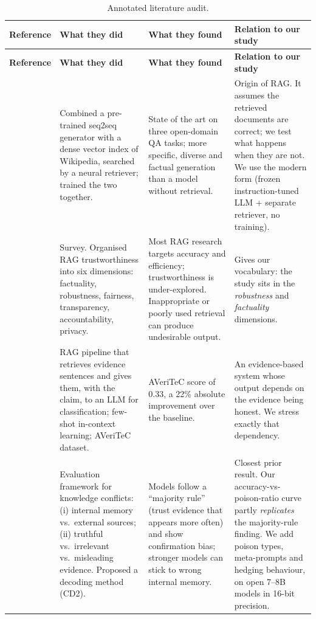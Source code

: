 \documentclass[11pt,a4paper]{report}
\begin{document}
{\small
\renewcommand{\arraystretch}{1.25}
\begin{longtable}{
  >{\raggedright\arraybackslash}p{2.2cm}
  >{\raggedright\arraybackslash}p{3.9cm}
  >{\raggedright\arraybackslash}p{3.9cm}
  >{\raggedright\arraybackslash}p{4.2cm}}
\caption{Annotated literature audit.}\label{tab:audit}\\
\toprule
\textbf{Reference} & \textbf{What they did} & \textbf{What they found} & \textbf{Relation to our study} \\
\midrule
\endfirsthead
\toprule
\textbf{Reference} & \textbf{What they did} & \textbf{What they found} & \textbf{Relation to our study} \\
\midrule
\endhead
\bottomrule
\endfoot

\citet{lewis2020rag}
& Combined a pre-trained seq2seq generator with a dense vector index of
  Wikipedia, searched by a neural retriever; trained the two together.
& State of the art on three open-domain QA tasks; more specific, diverse
  and factual generation than a model without retrieval.
& Origin of RAG. It assumes the retrieved documents are correct; we test
  what happens when they are not. We use the modern form (frozen
  instruction-tuned LLM + separate retriever, no training). \\
\midrule

\citet{zhou2024trustworthiness}
& Survey. Organised RAG trustworthiness into six dimensions: factuality,
  robustness, fairness, transparency, accountability, privacy.
& Most RAG research targets accuracy and efficiency; trustworthiness is
  under-explored. Inappropriate or poorly used retrieval can produce
  undesirable output.
& Gives our vocabulary: the study sits in the \emph{robustness} and
  \emph{factuality} dimensions. \\
\midrule

\citet{singal2024evidence}
& RAG pipeline that retrieves evidence sentences and gives them, with the
  claim, to an LLM for classification; few-shot in-context learning;
  AVeriTeC dataset.
& AVeriTeC score of 0.33, a 22\% absolute improvement over the baseline.
& An evidence-based system whose output depends on the evidence being
  honest. We stress exactly that dependency. \\
\midrule

\citet{jin2024tugofwar}
& Evaluation framework for knowledge conflicts: (i) internal memory vs.\
  external sources; (ii) truthful vs.\ irrelevant vs.\ misleading evidence.
  Proposed a decoding method (CD2).
& Models follow a ``majority rule'' (trust evidence that appears more
  often) and show confirmation bias; stronger models can stick to wrong
  internal memory.
& Closest prior result. Our accuracy-vs-poison-ratio curve partly
  \emph{replicates} the majority-rule finding. We add poison types,
  meta-prompts and hedging behaviour, on open 7--8B models in 16-bit precision. \\
\midrule


\end{longtable}}
\end{document}
